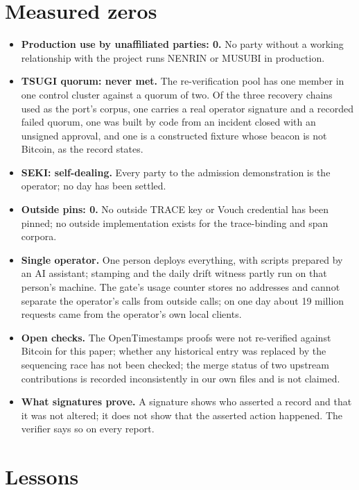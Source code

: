 \documentclass[11pt,a4paper]{article}
\begin{document}
\section{Measured zeros}\label{sec:zeros}

\begin{itemize}
\item \textbf{Production use by unaffiliated parties: 0.} No party without a working relationship with the project runs NENRIN or MUSUBI in production.
\item \textbf{TSUGI quorum: never met.} The re-verification pool has one member in one control cluster against a quorum of two. Of the three recovery chains used as the port's corpus, one carries a real operator signature and a recorded failed quorum, one was built by code from an incident closed with an unsigned approval, and one is a constructed fixture whose beacon is not Bitcoin, as the record states.
\item \textbf{SEKI: self-dealing.} Every party to the admission demonstration is the operator; no day has been settled.
\item \textbf{Outside pins: 0.} No outside TRACE key or Vouch credential has been pinned; no outside implementation exists for the trace-binding and span corpora.
\item \textbf{Single operator.} One person deploys everything, with scripts prepared by an AI assistant; stamping and the daily drift witness partly run on that person's machine. The gate's usage counter stores no addresses and cannot separate the operator's calls from outside calls; on one day about 19 million requests came from the operator's own local clients.
\item \textbf{Open checks.} The OpenTimestamps proofs were not re-verified against Bitcoin for this paper; whether any historical entry was replaced by the sequencing race has not been checked; the merge status of two upstream contributions is recorded inconsistently in our own files and is not claimed.
\item \textbf{What signatures prove.} A signature shows who asserted a record and that it was not altered; it does not show that the asserted action happened. The verifier says so on every report.
\end{itemize}

\section{Lessons}
\end{document}
